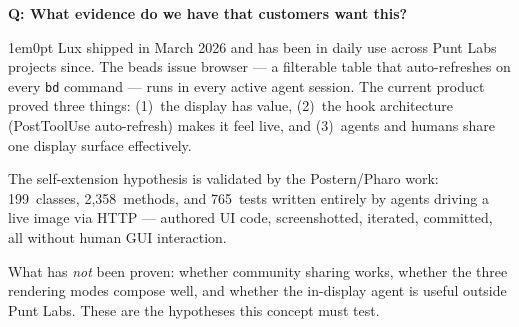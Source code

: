 \documentclass[11pt,letterpaper]{article}
\newcounter{faqnum}
\newenvironment{faqpair}[1]{%
  \needspace{4\baselineskip}%
  \vspace{0.5em}%
  \refstepcounter{faqnum}%
  \noindent\textbf{\color{SectionBlue}Q\thefaqnum: #1}\par\nopagebreak[4]%
  \vspace{0.2em}%
  \begin{adjustwidth}{1em}{0pt}%
  \setlength{\parindent}{0pt}%
}{%
  \end{adjustwidth}%
  \vspace{0.5em}%
}
\begin{document}
\begin{faqpair}{What evidence do we have that customers want this?}\label{faq:evidence}
  Lux shipped in March 2026 and has been in daily use across Punt Labs
  projects since.  The beads issue browser --- a filterable table that
  auto-refreshes on every \texttt{bd} command --- runs in every active
  agent session.  The current product proved three things: (1)~the display
  has value, (2)~the hook architecture (PostToolUse auto-refresh) makes it
  feel live, and (3)~agents and humans share one display surface effectively.

  The self-extension hypothesis is validated by the Postern/Pharo
  work\cite{postern2026}: 199~classes, 2,358~methods, and 765~tests
  written entirely by agents driving a live image via HTTP --- authored UI
  code, screenshotted, iterated, committed, all without human GUI
  interaction.

  What has \emph{not} been proven: whether community sharing works, whether
  the three rendering modes compose well, and whether the in-display agent
  is useful outside Punt Labs.  These are the hypotheses this concept must
  test.
\end{faqpair}
\end{document}
